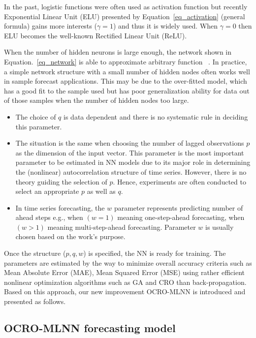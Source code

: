 \documentclass[review,3p,authoryear]{elsarticle}
\def \TN#1{\textcolor{gn_green}{~#1}}			%
\begin{document}
In the past, logistic functions were often used as activation function but recently Exponential Linear Unit (ELU) presented by Equation~\ref{eq_activation} (general formula) gains more interests ($\gamma = 1$) and thus it is widely used. 
When $\gamma = 0$ then ELU becomes the well-known Rectified Linear Unit (ReLU). %

When the number of hidden neurons is large enough, the network shown in Equation.~\ref{eq_network} is able to approximate arbitrary function ~\citep{ref_hornik}. In practice, a simple network structure with a small number of hidden nodes often works well in sample forecast applications. This may be due to the over-fitted model, which has a good fit to the sample used but has poor generalization ability for data out of those samples when the number of hidden nodes too large. 

\begin{itemize}
	\item The choice of $q$ is data dependent and there is no systematic rule in deciding this parameter. 
	\item The situation is the same when choosing the number of lagged observations $p$ as the dimension of the input vector. This parameter is the most important parameter to be estimated in NN models due to its major role in determining the (nonlinear) autocorrelation structure of time series. However, there is no theory guiding the selection of $p$. Hence, experiments are often conducted to select an appropriate $p$ as well as $q$. 
	\item In time series forecasting, the $w$ parameter represents predicting number of ahead steps e.g., when $(w=1)$ meaning one-step-ahead forecasting, when $(w>1)$ meaning multi-step-ahead forecasting. Parameter $w$ is usually chosen based on the work's purpose.  
\end{itemize}

Once the structure ($p, q, w$) is specified, the NN is ready for training. 
The parameters are estimated by the way to minimize overall accuracy criteria such as 
	Mean Absolute Error (MAE), 
	Mean Squared Error (MSE) 
using rather efficient nonlinear optimization algorithms such as GA and CRO than back-propagation. 
Based on this approach, our new improvement OCRO-MLNN is introduced and presented as follows.


\subsection{OCRO-MLNN forecasting model}
\label{ocro_mlnn_model}
\end{document}
